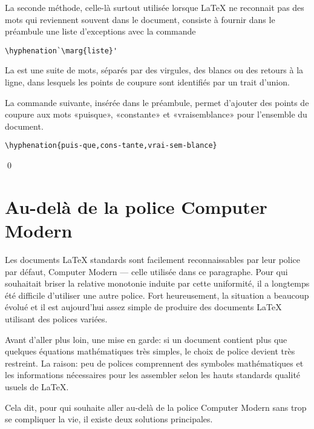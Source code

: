 La seconde méthode, celle-là surtout utilisée lorsque {\LaTeX} ne
reconnait pas des mots qui reviennent souvent dans le document,
consiste à fournir dans le préambule une liste d'exceptions avec la
commande
\begin{lstlisting}
\hyphenation`\marg{liste}'
\end{lstlisting}
La  est une suite de mots, séparés par des virgules, des
blancs ou des retours à la ligne, dans lesquels les points de coupure
sont identifiés par un trait d'union.

\begin{exemple}
  La commande suivante, insérée dans le préambule, permet d'ajouter
  des points de coupure aux mots «puisque», «constante» et
  «vraisemblance» pour l'ensemble du document.
\begin{lstlisting}
\hyphenation{puis-que,cons-tante,vrai-sem-blance}
\end{lstlisting}
  \qed
\end{exemple}



\section{Au-delà de la police Computer Modern}
\label{sec:trucs:polices}

{\CM%
  Les documents {\LaTeX} standards sont facilement reconnaissables par
  leur police par défaut, Computer Modern --- celle utilisée dans ce
  paragraphe. Pour qui souhaitait briser la relative monotonie induite
  par cette uniformité, il a longtemps été difficile d'utiliser une
  autre police. Fort heureusement, la situation a beaucoup évolué et
  il est aujourd'hui assez simple de produire des documents {\LaTeX}
  utilisant des polices variées.}

Avant d'aller plus loin, une mise en garde: si un document contient
plus que quelques équations mathématiques très simples, le choix de
police devient très restreint. La raison: peu de polices comprennent
des symboles mathématiques et les informations nécessaires pour les
assembler selon les hauts standards qualité usuels de {\LaTeX}.

Cela dit, pour qui souhaite aller au-delà de la police Computer Modern
sans trop se compliquer la vie, il existe deux solutions principales.

